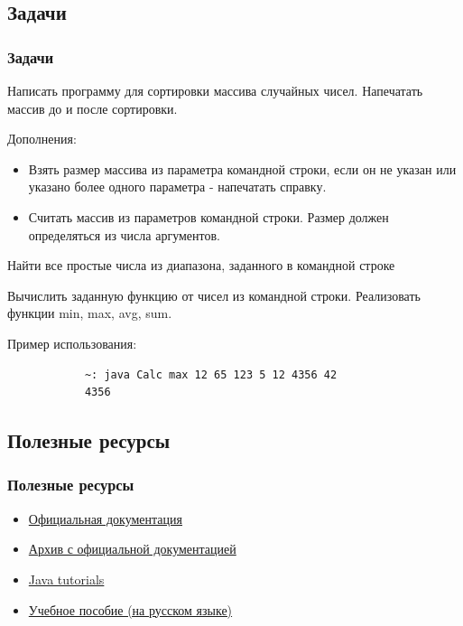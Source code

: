 \subsection{Задачи}
\begin{frame}[fragile]
	\frametitle{Задачи}

	\begin{enumerate}
		\begin{item}
			Написать программу для сортировки массива случайных чисел. Напечатать массив до и после сортировки.

			Дополнения:
			\begin{itemize}
				\item{Взять размер массива из параметра командной строки, если он не указан или указано более одного параметра - напечатать справку.}
				\item{Считать массив из параметров командной строки. Размер должен определяться из числа аргументов.}
			\end{itemize}
		\end{item}
		\begin{item}
			Найти все простые числа из диапазона, заданного в командной строке 
		\end{item}
		\begin{item}
			Вычислить заданную функцию от чисел из командной строки. Реализовать функции min, max, avg, sum.


			Пример использования:
			\begin{verbatim}
			~: java Calc max 12 65 123 5 12 4356 42
			4356
			\end{verbatim}

		\end{item}

	\end{enumerate}
\end{frame}

\subsection{Полезные ресурсы}
\begin{frame}
	\frametitle{Полезные ресурсы}

	\begin{itemize}
	\item{\href{http://docs.oracle.com/javase/6/docs/}{Официальная документация}}
	\item{\href{http://www.oracle.com/technetwork/java/javase/documentation/java-se-7-doc-download-435117.html}{Архив с официальной документацией}}
	\item{\href{http://docs.oracle.com/javase/tutorial/}{Java tutorials}}
	\item{\href{http://www.javable.com/tutorials/fesunov/}{Учебное пособие (на русском языке)}}
	\end{itemize}
\end{frame}

